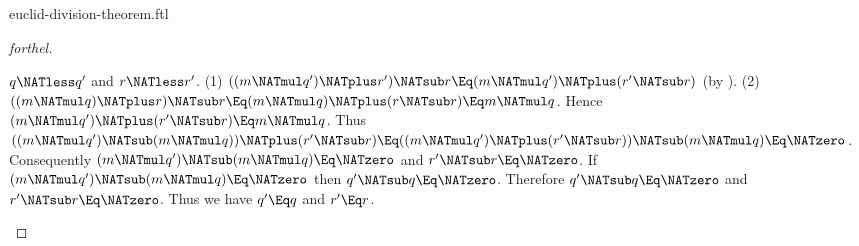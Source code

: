 \documentclass{stex}
\begin{document}
\begin{smodule}{euclid-division-theorem.ftl}
\begin{proof}[forthel]
  \begin{case}{$q \NATless q'$ and $r \NATless r'$.}
    (1) $((m \NATmul q') \NATplus r') \NATsub r \Eq (m \NATmul q') \NATplus (r' \NATsub r)$ (by ).
    (2) $((m \NATmul q) \NATplus r) \NATsub r
      \Eq (m \NATmul q) \NATplus (r \NATsub r)
      \Eq m \NATmul q$.
    Hence $(m \NATmul q') \NATplus (r' \NATsub r) \Eq m \NATmul q$.
    Thus $((m \NATmul q') \NATsub (m \NATmul q)) \NATplus (r' \NATsub r)
      \Eq ((m \NATmul q') \NATplus (r' \NATsub r)) \NATsub (m \NATmul q)
      \Eq \NATzero$.
    Consequently $(m \NATmul q') \NATsub (m \NATmul q) \Eq \NATzero$ and $r' \NATsub r \Eq \NATzero$.
    If $(m \NATmul q') \NATsub (m \NATmul q) \Eq \NATzero$ then $q' \NATsub q \Eq \NATzero$.
    Therefore $q' \NATsub q \Eq \NATzero$ and $r' \NATsub r \Eq \NATzero$.
    Thus we have $q' \Eq q$ and $r' \Eq r$.
  \end{case}
\end{proof}
\end{smodule}
\end{document}
